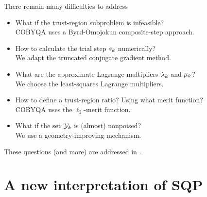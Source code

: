 \documentclass[
]{talk}
\newcommand*{\lmeq}[1][]{\mu\ifblank{#1}{}{_{#1}}}
\newcommand*{\lmub}[1][]{\lambda\ifblank{#1}{}{_{#1}}}
\newcommand*{\step}[1][]{s\ifblank{#1}{}{_{#1}}}
\newcommand*{\xpt}[1][]{\mathcal{Y}\ifblank{#1}{}{_{#1}}}
\begin{document}
\begin{frame}{There remain many difficulties to address}
    \begin{itemize}
        \setlength\itemsep{0.5em}
        \item What if the trust-region subproblem is \alert{infeasible}?\\
        \textcolor{FernGreen}{COBYQA uses a Byrd-Omojokun composite-step approach.}
        \item How to calculate the trial step $\step[k]$ \alert{numerically}?\\
        \textcolor{FernGreen}{We adapt the truncated conjugate gradient method.}
        \item What are the approximate Lagrange multipliers $\lmub[k]$ and $\lmeq[k]$?\\
        \textcolor{FernGreen}{We choose the least-squares Lagrange multipliers.}
        \item How to define a trust-region ratio? Using what merit function?\\
        \textcolor{FernGreen}{COBYQA uses the $\ell_2$-merit function.}
        \item What if the set $\xpt[k]$ is (almost) nonpoised?\\
        \textcolor{FernGreen}{We use a geometry-improving mechanism.}
    \end{itemize}

    \medskip

    These questions (and more) are addressed in \textcite{Ragonneau_2022}.
\end{frame}

\section{A new interpretation of SQP}
\end{document}
